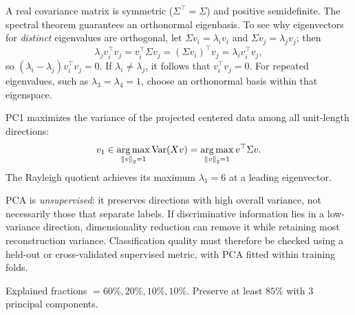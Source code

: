 A real covariance matrix is symmetric ($\Sigma^\top=\Sigma$) and positive semidefinite. The spectral theorem guarantees an orthonormal eigenbasis. To see why eigenvectors for \emph{distinct} eigenvalues are orthogonal, let $\Sigma v_i=\lambda_i v_i$ and $\Sigma v_j=\lambda_j v_j$; then
\[
\lambda_j v_i^\top v_j=v_i^\top\Sigma v_j
=(\Sigma v_i)^\top v_j=\lambda_i v_i^\top v_j,
\]
so $(\lambda_i-\lambda_j)v_i^\top v_j=0$. If $\lambda_i\neq\lambda_j$, it follows that $v_i^\top v_j=0$. For repeated eigenvalues, such as $\lambda_3=\lambda_4=1$, choose an orthonormal basis within that eigenspace.

PC1 maximizes the variance of the projected centered data among all unit-length directions:
\[
v_1\in\operatorname*{arg\,max}_{\left\lVert v\right\rVert_2=1}\operatorname{Var}(Xv)
=\operatorname*{arg\,max}_{\left\lVert v\right\rVert_2=1}v^\top\Sigma v.
\]
The Rayleigh quotient achieves its maximum $\lambda_1=6$ at a leading eigenvector.

PCA is \emph{unsupervised}: it preserves directions with high overall variance, not necessarily those that separate labels. If discriminative information lies in a low-variance direction, dimensionality reduction can remove it while retaining most reconstruction variance. Classification quality must therefore be checked using a held-out or cross-validated supervised metric, with PCA fitted within training folds.
\begin{answer}
Explained fractions $=60\%,20\%,10\%,10\%$. Preserve at least $85\%$ with $\boxed{3}$ principal components.
\end{answer}
